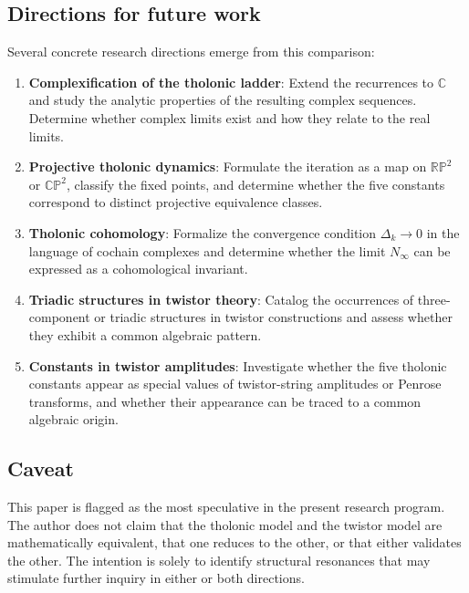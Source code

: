\documentclass[12pt]{article}
\begin{document}
\subsection{Directions for future work}\label{directions-for-future-work}

Several concrete research directions emerge from this comparison:

\begin{enumerate}
\def\labelenumi{\arabic{enumi}.}
\item
  \textbf{Complexification of the tholonic ladder}: Extend the
  recurrences to \(\mathbb{C}\) and study the analytic properties of the
  resulting complex sequences. Determine whether complex limits exist
  and how they relate to the real limits.
\item
  \textbf{Projective tholonic dynamics}: Formulate the iteration as a
  map on \(\mathbb{RP}^2\) or \(\mathbb{CP}^2\), classify the fixed
  points, and determine whether the five constants correspond to
  distinct projective equivalence classes.
\item
  \textbf{Tholonic cohomology}: Formalize the convergence condition
  \(\Delta_k \to 0\) in the language of cochain complexes and determine
  whether the limit \(N_\infty\) can be expressed as a cohomological
  invariant.
\item
  \textbf{Triadic structures in twistor theory}: Catalog the occurrences
  of three-component or triadic structures in twistor constructions and
  assess whether they exhibit a common algebraic pattern.
\item
  \textbf{Constants in twistor amplitudes}: Investigate whether the five
  tholonic constants appear as special values of twistor-string
  amplitudes or Penrose transforms, and whether their appearance can be
  traced to a common algebraic origin.
\end{enumerate}

\subsection{Caveat}\label{caveat}

This paper is flagged as the most speculative in the present research
program. The author does not claim that the tholonic model and the
twistor model are mathematically equivalent, that one reduces to the
other, or that either validates the other. The intention is solely to
identify structural resonances that may stimulate further inquiry in
either or both directions.
\end{document}
